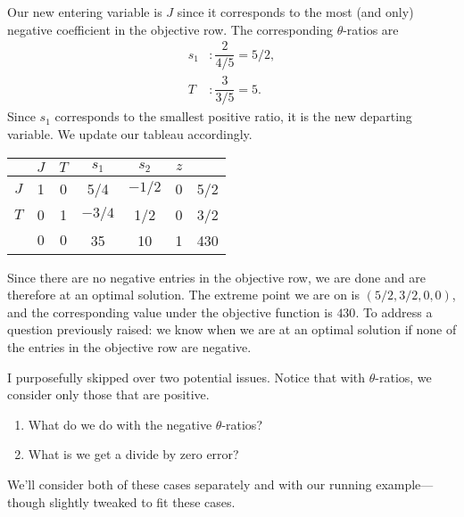 \documentclass[a4paper, 12pt]{article}
\numberwithin{equation}{section}
\numberwithin{figure}{section}
\theoremstyle{definition}
\begin{document}
Our new entering variable is $J$ since it corresponds to the most (and only)
negative coefficient in the objective row. The corresponding $\theta$-ratios are 
\begin{align*}
	s_1 &: \dfrac{2}{4/5} = 5/2, \\
	T &: \dfrac{3}{3/5} = 5.
\end{align*}
Since $s_1$ corresponds to the smallest positive ratio, it is the new departing
variable. We update our tableau accordingly.
\begin{center}
	\begin{tabular}{|c|ccccc|c|}
		\hline
		& $J$ & $T$ & $s_1$ & $s_2$ & $z$ & \\ \hline
		$J$ & 1 & 0 & 5/4 & $-1/2$ & 0 & 5/2 \\ \hline
		$T$ & 0 & 1 & $-3/4$ & 1/2 & 0 & 3/2 \\ \hline 
		& $0$ & $0$ & 35 & 10 & 1 & 430 \\ \hline
	\end{tabular}
\end{center}
Since there are no negative entries in the objective row, we are done and are
therefore at an optimal solution. The extreme point we are on is $(5/2, 3/2, 0,
0)$, and the corresponding value under the objective function is $430$. To
address a question previously raised: we know when we are at an optimal solution
if none of the entries in the objective row are negative.

I purposefully skipped over two potential issues. Notice that with
$\theta$-ratios, we consider only those that are positive. 
\begin{enumerate}
	\item What do we do with the negative $\theta$-ratios? 
	\item What is we get a divide by zero error? 
\end{enumerate}
We'll consider both of these cases separately and with our running
example---though slightly tweaked to fit these cases.
\end{document}
